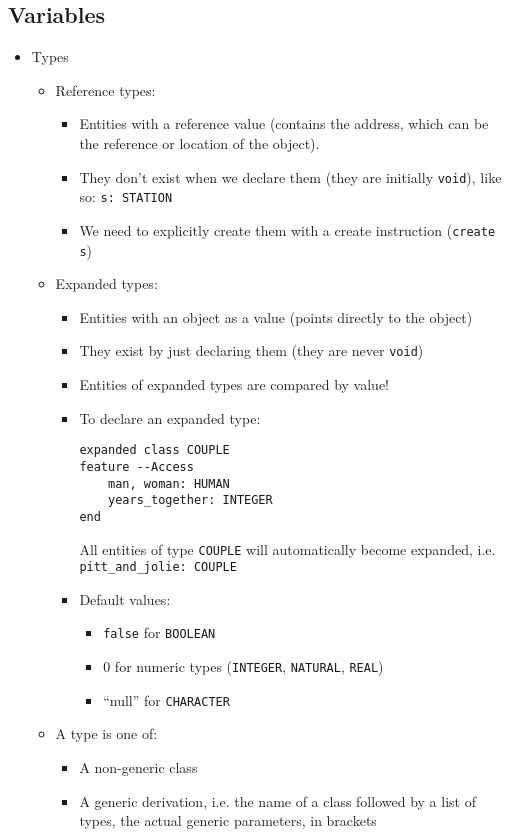 \documentclass[a4paper]{article}
\newcommand{\inline}[1]{\lstinline!#1!}%
\begin{document}
\subsection{Variables}
\begin{itemize}
\item Types
\begin{itemize}
\item Reference types: 
\begin{itemize}
\item Entities with a reference value (contains the address, which can be the reference or location of the object).
\item They don't exist when we declare them (they are initially \inline{void}), like so: \inline{s: STATION}
\item We need to explicitly create them with a create instruction (\inline{create s})
\end{itemize}
\item Expanded types:
\begin{itemize}
\item Entities with an object as a value (points directly to the object)
\item They exist by just declaring them (they are never \inline{void})
\item Entities of expanded types are compared by value!
\item To declare an expanded type:
\begin{lstlisting}
expanded class COUPLE
feature --Access
	man, woman: HUMAN
	years_together: INTEGER
end
\end{lstlisting}
All entities of type \inline{COUPLE} will automatically become expanded, i.e. \inline{pitt_and_jolie: COUPLE}
\item Default values:
\begin{itemize}
\item \inline{false} for \inline{BOOLEAN}
\item 0 for numeric types (\inline{INTEGER}, \inline{NATURAL}, \inline{REAL})
\item ``null'' for \inline{CHARACTER}
\end{itemize}
\end{itemize}
\item A type is one of:
\begin{itemize}
\item A non-generic class
\item A generic derivation, i.e. the name of a class followed by a list of types, the actual generic parameters, in brackets

\end{itemize}
\end{itemize}
\end{itemize}
\end{document}
